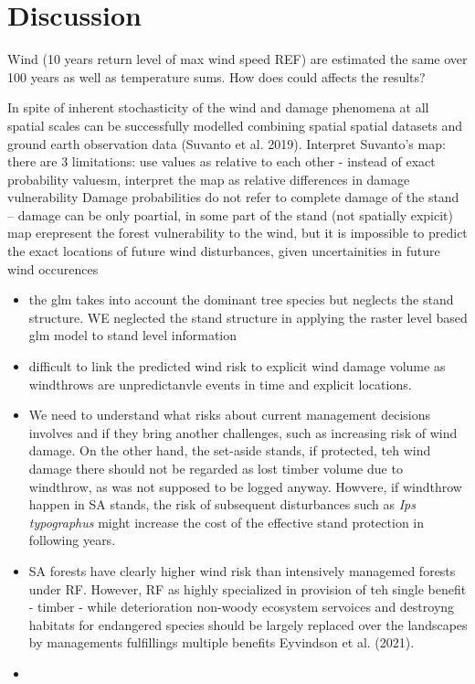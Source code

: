 \documentclass[]{elsarticle} %
\begin{document}
\section{Discussion}\label{discussion}

Wind (10 years return level of max wind speed REF) are estimated the
same over 100 years as well as temperature sums. How does could affects
the results?

In spite of inherent stochasticity of the wind and damage phenomena at
all spatial scales can be successfully modelled combining spatial
spatial datasets and ground earth observation data (Suvanto et al.
2019). Interpret Suvanto's map: there are 3 limitations: use values as
relative to each other - instead of exact probability valuesm, interpret
the map as relative differences in damage vulnerability Damage
probabilities do not refer to complete damage of the stand -- damage can
be only poartial, in some part of the stand (not spatially expicit) map
erepresent the forest vulnerability to the wind, but it is impossible to
predict the exact locations of future wind disturbances, given
uncertainities in future wind occurences

\begin{itemize}
\item
  the glm takes into account the dominant tree species but neglects the
  stand structure. WE neglected the stand structure in applying the
  raster level based glm model to stand level information
\item
  difficult to link the predicted wind risk to explicit wind damage
  volume as windthrows are unpredictanvle events in time and explicit
  locations.
\item
  We need to understand what risks about current management decisions
  involves and if they bring another challenges, such as increasing risk
  of wind damage. On the other hand, the set-aside stands, if protected,
  teh wind damage there should not be regarded as lost timber volume due
  to windthrow, as was not supposed to be logged anyway. Howvere, if
  windthrow happen in SA stands, the risk of subsequent disturbances
  such as \emph{Ips typographus} might increase the cost of the
  effective stand protection in following years.
\item
  SA forests have clearly higher wind risk than intensively managemed
  forests under RF. However, RF as highly specialized in provision of
  teh single benefit - timber - while deterioration non-woody ecosystem
  servoices and destroyng habitats for endangered species should be
  largely replaced over the landscapes by managements fulfillings
  multiple benefits Eyvindson et al. (2021).
\item
\end{itemize}
\end{document}
